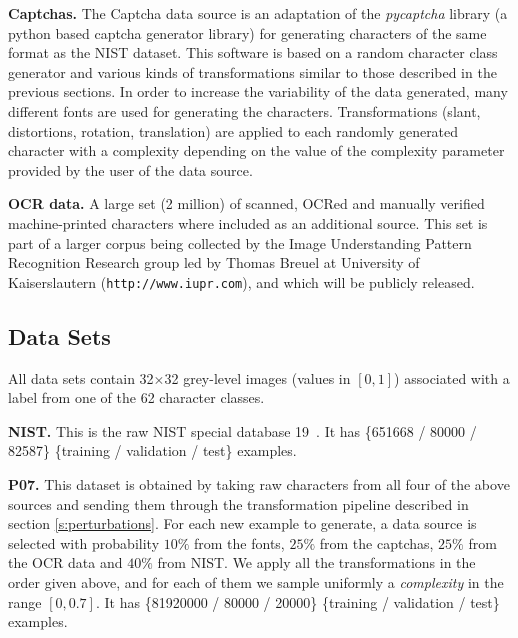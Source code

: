 \documentclass{article} %
\begin{document}
{\bf Captchas.}
The Captcha data source is an adaptation of the \emph{pycaptcha} library (a python based captcha generator library) for 
generating characters of the same format as the NIST dataset. This software is based on
a random character class generator and various kinds of transformations similar to those described in the previous sections. 
In order to increase the variability of the data generated, many different fonts are used for generating the characters. 
Transformations (slant, distortions, rotation, translation) are applied to each randomly generated character with a complexity
depending on the value of the complexity parameter provided by the user of the data source. 
\vspace*{-1mm}

{\bf OCR data.}
A large set (2 million) of scanned, OCRed and manually verified machine-printed 
characters where included as an
additional source. This set is part of a larger corpus being collected by the Image Understanding
Pattern Recognition Research group led by Thomas Breuel at University of Kaiserslautern 
({\tt http://www.iupr.com}), and which will be publicly released.

\vspace*{-3mm}
\subsection{Data Sets}
\vspace*{-2mm}

All data sets contain 32$\times$32 grey-level images (values in $[0,1]$) associated with a label
from one of the 62 character classes.
\vspace*{-1mm}

{\bf NIST.} This is the raw NIST special database 19~\citep{Grother-1995}. It has
\{651668 / 80000 / 82587\} \{training / validation / test\} examples.
\vspace*{-1mm}

{\bf P07.} This dataset is obtained by taking raw characters from all four of the above sources
and sending them through the transformation pipeline described in section \ref{s:perturbations}.
For each new example to generate, a data source is selected with probability $10\%$ from the fonts,
$25\%$ from the captchas, $25\%$ from the OCR data and $40\%$ from NIST. We apply all the transformations in the
order given above, and for each of them we sample uniformly a \emph{complexity} in the range $[0,0.7]$.
It has \{81920000 / 80000 / 20000\} \{training / validation / test\} examples.
\vspace*{-1mm}
\end{document}
